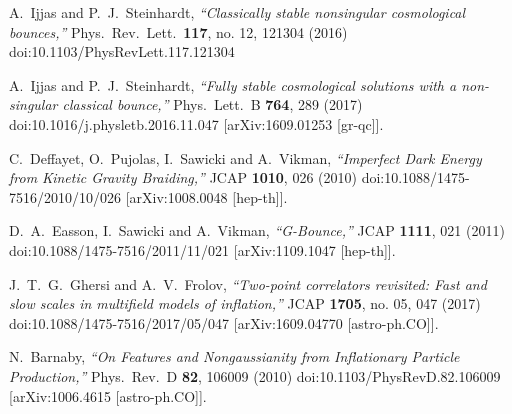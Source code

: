 \documentclass[aps,prd,reprint,twocolumn,showpacs,nofootinbib,superscriptaddress,floatfix]{revtex4-1}
\begin{document}
\begin{thebibliography}{99}

  A.~Ijjas and P.~J.~Steinhardt,
  \textit{``Classically stable nonsingular cosmological bounces,''}
  Phys.\ Rev.\ Lett.\  {\bf 117}, no. 12, 121304 (2016)
  doi:10.1103/PhysRevLett.117.121304
  
  A.~Ijjas and P.~J.~Steinhardt,
  \textit{``Fully stable cosmological solutions with a non-singular classical bounce,''}
  Phys.\ Lett.\ B {\bf 764}, 289 (2017)
  doi:10.1016/j.physletb.2016.11.047
  [arXiv:1609.01253 [gr-qc]].
  
  C.~Deffayet, O.~Pujolas, I.~Sawicki and A.~Vikman,
  \textit{``Imperfect Dark Energy from Kinetic Gravity Braiding,''}
  JCAP {\bf 1010}, 026 (2010)
  doi:10.1088/1475-7516/2010/10/026
  [arXiv:1008.0048 [hep-th]].
  
  D.~A.~Easson, I.~Sawicki and A.~Vikman,
 \textit{``G-Bounce,''}
  JCAP {\bf 1111}, 021 (2011)
  doi:10.1088/1475-7516/2011/11/021
  [arXiv:1109.1047 [hep-th]].
  
  
  J.~T.~G.~Ghersi and A.~V.~Frolov,
  \textit{``Two-point correlators revisited: Fast and slow scales in multifield models of inflation,''}
  JCAP {\bf 1705}, no. 05, 047 (2017)
  doi:10.1088/1475-7516/2017/05/047
  [arXiv:1609.04770 [astro-ph.CO]].
  
  N.~Barnaby,
  \textit{``On Features and Nongaussianity from Inflationary Particle Production,''}
  Phys.\ Rev.\ D {\bf 82}, 106009 (2010)
  doi:10.1103/PhysRevD.82.106009
  [arXiv:1006.4615 [astro-ph.CO]].

\end{thebibliography}
\end{document}

